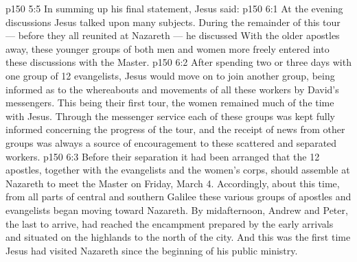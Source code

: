\vs p150 5:5 In summing up his final statement, Jesus said: 
\vs p150 6:1 At the evening discussions Jesus talked upon many subjects. During the remainder of this tour --- before they all reunited at Nazareth --- he discussed  With the older apostles away, these younger groups of both men and women more freely entered into these discussions with the Master.
\vs p150 6:2 After spending two or three days with one group of 12 evangelists, Jesus would move on to join another group, being informed as to the whereabouts and movements of all these workers by David’s messengers. This being their first tour, the women remained much of the time with Jesus. Through the messenger service each of these groups was kept fully informed concerning the progress of the tour, and the receipt of news from other groups was always a source of encouragement to these scattered and separated workers.
\vs p150 6:3 Before their separation it had been arranged that the 12 apostles, together with the evangelists and the women’s corps, should assemble at Nazareth to meet the Master on Friday, March 4. Accordingly, about this time, from all parts of central and southern Galilee these various groups of apostles and evangelists began moving toward Nazareth. By midafternoon, Andrew and Peter, the last to arrive, had reached the encampment prepared by the early arrivals and situated on the highlands to the north of the city. And this was the first time Jesus had visited Nazareth since the beginning of his public ministry.
